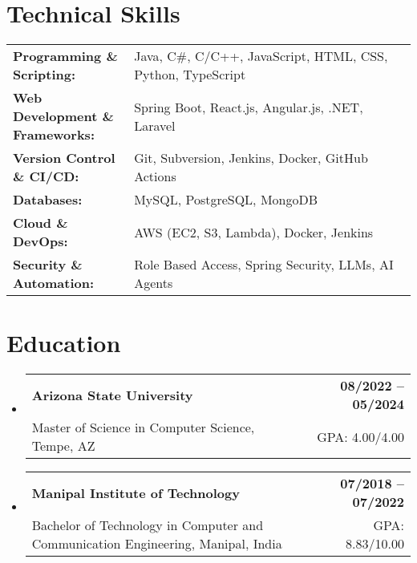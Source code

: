 \documentclass[letterpaper,11pt]{article}
\makeatletter
\newcommand{\educationSubheading}[4]{
  \vspace{-2pt}\item
    \begin{tabular*}{1.0\textwidth}[t]{l@{\extracolsep{\fill}}r}
      \textbf{\small #1} & \textbf{\small #2} \\
      {\small#3} & {\small #4} \\
    \end{tabular*}\vspace{-7pt}
}
\newcommand{\resumeSubHeadingListStart}{\begin{itemize}[leftmargin=0pt, label={}]}
\newcommand{\resumeSubHeadingListEnd}{\end{itemize}}
\makeatother
\begin{document}
\section{Technical Skills}
        \vspace{-14pt}
        \begin{table}[h]
            \footnotesize
            \begin{tabular}{p{0.3\linewidth} p{0.7\linewidth}}
                \textbf{Programming \& Scripting:} & Java, C\#, C/C++, JavaScript, HTML, CSS, Python, TypeScript \\
                \textbf{Web Development \& Frameworks:} & Spring Boot, React.js, Angular.js, .NET, Laravel \\
                \textbf{Version Control \& CI/CD:} & Git, Subversion, Jenkins, Docker, GitHub Actions \\
                \textbf{Databases:} & MySQL, PostgreSQL, MongoDB \\
                \textbf{Cloud \& DevOps:} & AWS (EC2, S3, Lambda), Docker, Jenkins \\
                \textbf{Security \& Automation:} & Role Based Access, Spring Security, LLMs, AI Agents \\
            \end{tabular}
        \end{table}

 \vspace{-15pt}

\section{Education}
  \resumeSubHeadingListStart
    \educationSubheading
      {Arizona State University}{08/2022 -- 05/2024}
      {Master of Science in Computer Science, Tempe, AZ}{GPA: 4.00/4.00}

    \educationSubheading
      {Manipal Institute of Technology}{07/2018 -- 07/2022}
      {Bachelor of Technology in Computer and Communication Engineering, Manipal, India}{GPA: 8.83/10.00}
  \resumeSubHeadingListEnd
\end{document}
